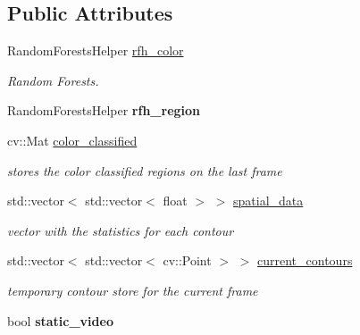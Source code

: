 \subsection*{Public Attributes}
\begin{DoxyCompactItemize}
\item 
\hypertarget{class_fire_tracker_s_a_a457f2096ec25f6e7e163ba35744a1f4e}{}Random\+Forests\+Helper \hyperlink{class_fire_tracker_s_a_a457f2096ec25f6e7e163ba35744a1f4e}{rfh\+\_\+color}\label{class_fire_tracker_s_a_a457f2096ec25f6e7e163ba35744a1f4e}

\begin{DoxyCompactList}\small\item\em Random Forests. \end{DoxyCompactList}\item 
\hypertarget{class_fire_tracker_s_a_aee2677acfd7b6ff50828ee183b1eca0b}{}Random\+Forests\+Helper {\bfseries rfh\+\_\+region}\label{class_fire_tracker_s_a_aee2677acfd7b6ff50828ee183b1eca0b}

\item 
\hypertarget{class_fire_tracker_s_a_ac139cc55cf55def96683867873bc9841}{}cv\+::\+Mat \hyperlink{class_fire_tracker_s_a_ac139cc55cf55def96683867873bc9841}{color\+\_\+classified}\label{class_fire_tracker_s_a_ac139cc55cf55def96683867873bc9841}

\begin{DoxyCompactList}\small\item\em stores the color classified regions on the last frame \end{DoxyCompactList}\item 
\hypertarget{class_fire_tracker_s_a_a41191012c3a576338e0a1c18e4670e03}{}std\+::vector$<$ std\+::vector$<$ float $>$ $>$ \hyperlink{class_fire_tracker_s_a_a41191012c3a576338e0a1c18e4670e03}{spatial\+\_\+data}\label{class_fire_tracker_s_a_a41191012c3a576338e0a1c18e4670e03}

\begin{DoxyCompactList}\small\item\em vector with the statistics for each contour \end{DoxyCompactList}\item 
\hypertarget{class_fire_tracker_s_a_aa436b53f5f363c7ef9ae5dab5d8b6a5b}{}std\+::vector$<$ std\+::vector$<$ cv\+::\+Point $>$ $>$ \hyperlink{class_fire_tracker_s_a_aa436b53f5f363c7ef9ae5dab5d8b6a5b}{current\+\_\+contours}\label{class_fire_tracker_s_a_aa436b53f5f363c7ef9ae5dab5d8b6a5b}

\begin{DoxyCompactList}\small\item\em temporary contour store for the current frame \end{DoxyCompactList}\item 
\hypertarget{class_fire_tracker_s_a_abe54bba15c2d4f0c76050eaca5304674}{}bool {\bfseries static\+\_\+video}\label{class_fire_tracker_s_a_abe54bba15c2d4f0c76050eaca5304674}


\end{DoxyCompactItemize}
